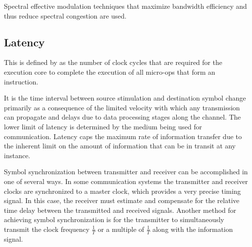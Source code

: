Spectral effective modulation techniques that maximize bandwidth efficiency and thus reduce spectral
congestion are used.\cite{AWGN}

\subsection{Latency}
This is defined by \cite{latintel} as the number of clock cycles that are required for the execution core to complete the execution of all micro-ops that form an instruction.

It is the time interval between source stimulation and destination \gls{symbol} change primarily as a consequence of the limited velocity with which any transmission can propagate and delays due to data processing stages along the channel.
The lower limit of latency is determined by the medium being used for communication. Latency caps the maximum rate of information transfer due to the inherent limit on the amount of information that can be in transit at any instance. 

Symbol synchronization between transmitter and receiver can be accomplished in one of several ways. In some
communication systems the transmitter and receiver clocks are synchronized to a master clock, which
provides a very precise timing signal. In this case, the receiver must estimate and compensate for the
relative time delay between the transmitted and received signals. Another method for achieving \gls{symbol}
synchronization is for the transmitter to simultaneously transmit the clock frequency $\frac{1}{T}$ or a multiple of $\frac{1}{T}$ along with the information signal.\cite{Salehi}

%
% 
 
